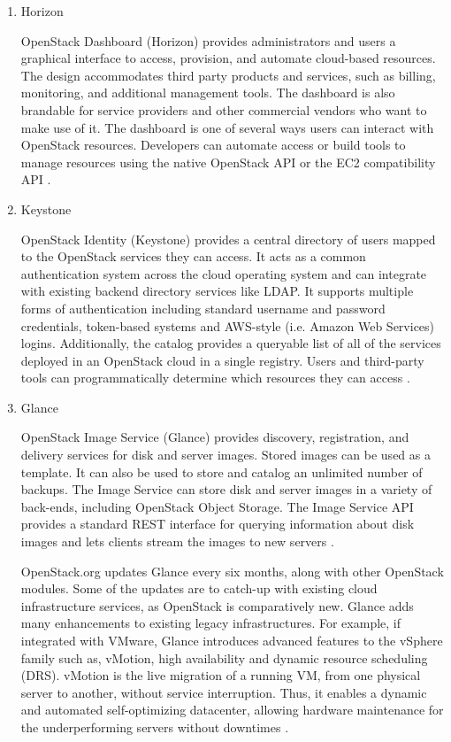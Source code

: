 \begin{enumerate}
        \item Horizon
        \par
        OpenStack Dashboard (Horizon) provides administrators and users a graphical interface to access, provision, and automate cloud-based resources. The design accommodates third party products and services, such as billing, monitoring, and additional management tools. The dashboard is also brandable for service providers and other commercial vendors who want to make use of it. The dashboard is one of several ways users can interact with OpenStack resources. Developers can automate access or build tools to manage resources using the native OpenStack API or the EC2 compatibility API \cite{openstack}\cite{wiki}.
        \item Keystone
        \par
        OpenStack Identity (Keystone) provides a central directory of users mapped to the OpenStack services they can access. It acts as a common authentication system across the cloud operating system and can integrate with existing backend directory services like LDAP. It supports multiple forms of authentication including standard username and password credentials, token-based systems and AWS-style (i.e. Amazon Web Services) logins. Additionally, the catalog provides a queryable list of all of the services deployed in an OpenStack cloud in a single registry. Users and third-party tools can programmatically determine which resources they can access \cite{openstack}\cite{wiki}.
        \item Glance
        \par
        OpenStack Image Service (Glance) provides discovery, registration, and delivery services for disk and server images. Stored images can be used as a template. It can also be used to store and catalog an unlimited number of backups. The Image Service can store disk and server images in a variety of back-ends, including OpenStack Object Storage. The Image Service API provides a standard REST interface for querying information about disk images and lets clients stream the images to new servers \cite{wiki}.
        \par
        OpenStack.org updates Glance every six months, along with other OpenStack modules. Some of the updates are to catch-up with existing cloud infrastructure services, as OpenStack is comparatively new. Glance adds many enhancements to existing legacy infrastructures. For example, if integrated with VMware, Glance introduces advanced features to the vSphere family such as, vMotion, high availability and dynamic resource scheduling (DRS). vMotion is the live migration of a running VM, from one physical server to another, without service interruption. Thus, it enables a dynamic and automated self-optimizing datacenter, allowing hardware maintenance for the underperforming servers without downtimes \cite{wiki}.

\end{enumerate}
